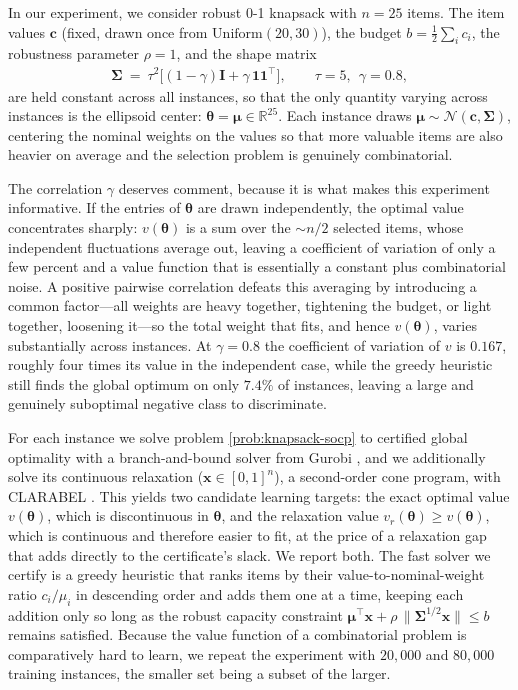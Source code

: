 \documentclass[10pt]{article} %
\theoremstyle{plain}
\theoremstyle{definition}
\theoremstyle{remark}
\begin{document}
In our experiment, we consider robust 0-1 knapsack with $n=25$ items. The item values $\mathbf{c}$ (fixed, drawn once from $\mathrm{Uniform}(20, 30)$), the budget $b = \tfrac{1}{2}\sum_i c_i$, the robustness parameter $\rho = 1$, and the shape matrix
\begin{align*}
    \bm{\Sigma} ~=~ \tau^2 \big[ (1 - \gamma) \mathbf{I} + \gamma \, \mathbf{1}\mathbf{1}^\top \big], \qquad \tau = 5, ~~ \gamma = 0.8,
\end{align*}
are held constant across all instances, so that the only quantity varying across instances is the ellipsoid center: $\bm{\theta} = \bm{\mu} \in \mathbb{R}^{25}$. Each instance draws $\bm{\mu} \sim \mathcal{N}(\mathbf{c}, \bm{\Sigma})$, centering the nominal weights on the values so that more valuable items are also heavier on average and the selection problem is genuinely combinatorial.

The correlation $\gamma$ deserves comment, because it is what makes this experiment informative. If the entries of $\bm{\theta}$ are drawn independently, the optimal value concentrates sharply: $v(\bm{\theta})$ is a sum over the $\sim\!n/2$ selected items, whose independent fluctuations average out, leaving a coefficient of variation of only a few percent and a value function that is essentially a constant plus combinatorial noise. A positive pairwise correlation defeats this averaging by introducing a common factor---all weights are heavy together, tightening the budget, or light together, loosening it---so the total weight that fits, and hence $v(\bm{\theta})$, varies substantially across instances. At $\gamma = 0.8$ the coefficient of variation of $v$ is $0.167$, roughly four times its value in the independent case, while the greedy heuristic still finds the global optimum on only $7.4\%$ of instances, leaving a large and genuinely suboptimal negative class to discriminate.

For each instance we solve problem \cref{prob:knapsack-socp}{}{} to certified global optimality with a branch-and-bound solver from Gurobi \citep{gurobi}, and we additionally solve its continuous relaxation ($\mathbf{x} \in [0,1]^n$), a second-order cone program, with CLARABEL \citep{clarabel}. This yields two candidate learning targets: the exact optimal value $v(\bm{\theta})$, which is discontinuous in $\bm{\theta}$, and the relaxation value $v_r(\bm{\theta}) \geq v(\bm{\theta})$, which is continuous and therefore easier to fit, at the price of a relaxation gap that adds directly to the certificate's slack. We report both.
The fast solver we certify is a greedy heuristic that ranks items by their value-to-nominal-weight ratio $c_i / \mu_i$ in descending order and adds them one at a time, keeping each addition only so long as the robust capacity constraint $\bm{\mu}^\top \mathbf{x} + \rho\,\|\bm{\Sigma}^{1/2}\mathbf{x}\| \le b$ remains satisfied.
Because the value function of a combinatorial problem is comparatively hard to learn, we repeat the experiment with $20{,}000$ and $80{,}000$ training instances, the smaller set being a subset of the larger.
\end{document}
